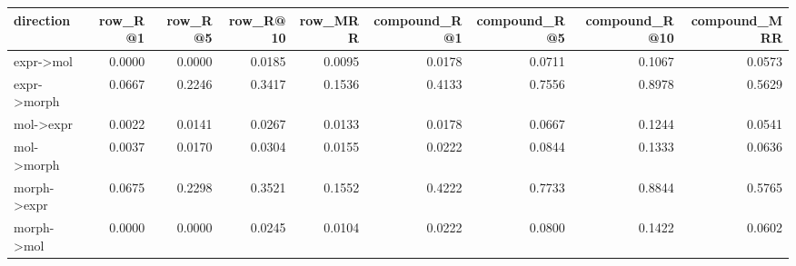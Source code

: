 \begin{tabular}{lrrrrrrrr}
\toprule
direction & row_R@1 & row_R@5 & row_R@10 & row_MRR & compound_R@1 & compound_R@5 & compound_R@10 & compound_MRR \\
\midrule
expr->mol & 0.0000 & 0.0000 & 0.0185 & 0.0095 & 0.0178 & 0.0711 & 0.1067 & 0.0573 \\
expr->morph & 0.0667 & 0.2246 & 0.3417 & 0.1536 & 0.4133 & 0.7556 & 0.8978 & 0.5629 \\
mol->expr & 0.0022 & 0.0141 & 0.0267 & 0.0133 & 0.0178 & 0.0667 & 0.1244 & 0.0541 \\
mol->morph & 0.0037 & 0.0170 & 0.0304 & 0.0155 & 0.0222 & 0.0844 & 0.1333 & 0.0636 \\
morph->expr & 0.0675 & 0.2298 & 0.3521 & 0.1552 & 0.4222 & 0.7733 & 0.8844 & 0.5765 \\
morph->mol & 0.0000 & 0.0000 & 0.0245 & 0.0104 & 0.0222 & 0.0800 & 0.1422 & 0.0602 \\
\bottomrule
\end{tabular}
